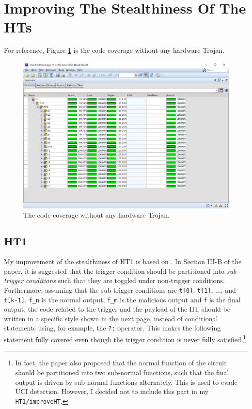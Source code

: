 \documentclass{article}
\begin{document}
\section{Improving The Stealthiness Of The HTs}

For reference, Figure \ref{nHT123} is the code coverage without any hardware Trojan.

\begin{figure}[h] \centering
\includegraphics[width=\textwidth]{nHT123}
\caption{The code coverage without any hardware Trojan.}
\label{nHT123}
\end{figure}

\subsection{HT1}

My improvement of the stealthiness of HT1 is based on \cite{6581574}. In Section III-B of the paper, it is suggested that the trigger condition should be partitioned into \textit{sub-trigger conditions} such that they are toggled under non-trigger conditions. Furthermore, assuming that the sub-trigger conditions are \verb|t[0]|, \verb|t[1]|, ..., and \verb|t[k-1]|, \verb|f_n| is the normal output, \verb|f_m| is the malicious output and \verb|f| is the final output, the code related to the trigger and the payload of the HT should be written in a specific style shown in the next page, instead of conditional statements using, for example, the \verb|?:| operator. This makes the following statement fully covered even though the trigger condition is never fully satisfied.\footnote{In fact, the paper also proposed that the normal function of the circuit should be partitioned into two sub-normal functions, such that the final output is driven by sub-normal functions alternately. This is used to evade UCI detection. However, I decided not to include this part in my \texttt{HT1/improveHT}.}
\end{document}
